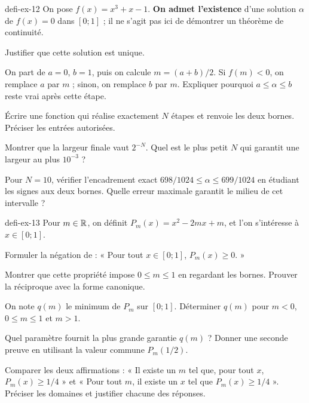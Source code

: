 \begin{blocEdition}{defi-ex-12}
On pose $f(x)=x^3+x-1$. \textbf{On admet l'existence} d'une solution $\alpha$ de
$f(x)=0$ dans $[0;1]$ ; il ne s'agit pas ici de démontrer un théorème de continuité.
\begin{questions}
\item Justifier que cette solution est unique.
\item On part de $a=0$, $b=1$, puis on calcule $m=(a+b)/2$.
Si $f(m)<0$, on remplace $a$ par $m$ ; sinon, on remplace $b$ par $m$.
Expliquer pourquoi $a\leq\alpha\leq b$ reste vrai après cette étape.
\item Écrire une fonction qui réalise exactement $N$ étapes et renvoie les deux bornes.
Préciser les entrées autorisées.
\item Montrer que la largeur finale vaut $2^{-N}$.
Quel est le plus petit $N$ qui garantit une largeur au plus $10^{-3}$ ?
\item Pour $N=10$, vérifier l'encadrement exact
$698/1024\leq\alpha\leq699/1024$ en étudiant les signes aux deux bornes.
Quelle erreur maximale garantit le milieu de cet intervalle ?
\end{questions}
\end{blocEdition}

\begin{blocEdition}{defi-ex-13}
Pour $m\in\mathbb{R}$, on définit $P_m(x)=x^2-2mx+m$, et l'on s'intéresse à $x\in[0;1]$.
\begin{questions}
\item Formuler la négation de : « Pour tout $x\in[0;1]$, $P_m(x)\geq0$. »
\item Montrer que cette propriété impose $0\leq m\leq1$ en regardant les bornes.
Prouver la réciproque avec la forme canonique.
\item On note $q(m)$ le minimum de $P_m$ sur $[0;1]$. Déterminer $q(m)$
pour $m<0$, $0\leq m\leq1$ et $m>1$.
\item Quel paramètre fournit la plus grande garantie $q(m)$ ?
Donner une seconde preuve en utilisant la valeur commune $P_m(1/2)$.
\item Comparer les deux affirmations : « Il existe un $m$ tel que, pour tout $x$,
$P_m(x)\geq1/4$ » et « Pour tout $m$, il existe un $x$ tel que $P_m(x)\geq1/4$ ».
Préciser les domaines et justifier chacune des réponses.
\end{questions}
\end{blocEdition}

